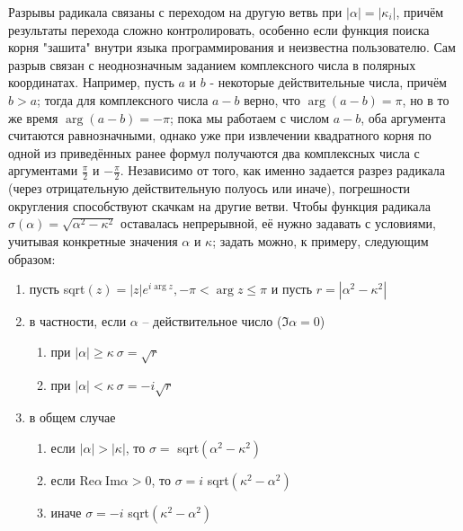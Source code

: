 \documentclass[a4paper, 12pt]{article}
\begin{document}
Разрывы радикала связаны с переходом на другую ветвь при $|\alpha|=|\kappa_i|$, причём результаты перехода сложно контролировать, особенно если функция поиска корня "зашита" внутри языка программирования и неизвестна пользователю. Сам разрыв связан с неоднозначным заданием комплексного числа в полярных координатах. Например, пусть $a$ и $b$ - некоторые действительные числа, причём $b>a$; тогда для комплексного числа $a-b$ верно, что $\arg(a-b)=\pi$, но в то же время $\arg(a-b)=-\pi$; пока мы работаем с числом $a-b$, оба аргумента считаются равнозначными, однако уже при извлечении квадратного корня по одной из приведённых ранее формул получаются два комплексных числа с аргументами $\frac{\pi}{2}$ и $-\frac{\pi}{2}$. Независимо от того, как именно задается разрез радикала (через отрицательную действительную полуось или иначе), погрешности округления способствуют скачкам на другие ветви. Чтобы функция радикала $\sigma(\alpha)=\sqrt{\alpha^2-\kappa^2}$ оставалась непрерывной, её нужно задавать с условиями, учитывая конкретные значения $\alpha$ и $\kappa$; задать можно, к примеру, следующим образом:
\begin{enumerate}
    \item пусть sqrt$(z)=|z|e^{i\arg z},-\pi < \arg z \leq \pi$ и пусть $r=|\alpha^2-\kappa^2|$
    \item в частности, если $\alpha$ -- действительное число ($\Im \alpha=0$)
    \begin{enumerate}
        \item при $|\alpha|\geq\kappa\  \sigma = \sqrt{r}$ 
        \item при $|\alpha|<\kappa\  \sigma = -i\sqrt{r}$ 
    \end{enumerate}
    \item в общем случае 
    \begin{enumerate}
    \item если $|\alpha|>|\kappa|$, то $\sigma=$ sqrt$(\alpha^2-\kappa^2)$
        \item если $\mathrm{Re} \alpha \ \mathrm{Im} \alpha >0$, то $\sigma=i$ sqrt$(\kappa^2-\alpha^2)$
        \item иначе $\sigma=-i$ sqrt$(\kappa^2-\alpha^2)$
    \end{enumerate}
\end{enumerate}
\end{document}
